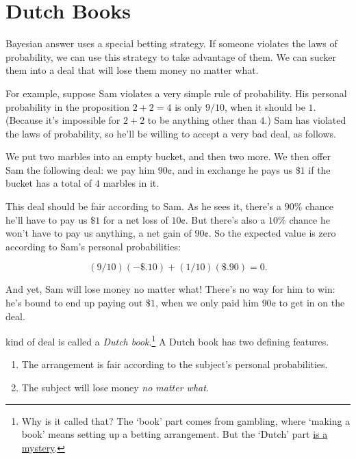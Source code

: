 \documentclass[justified]{tufte-book}
\providecommand{\tightlist}{%
  \setlength{\itemsep}{0pt}\setlength{\parskip}{0pt}}
\theoremstyle{definition}
\theoremstyle{definition}
\theoremstyle{definition}
\theoremstyle{remark}
\begin{document}
\hypertarget{dutch-books-1}{%
\section{Dutch Books}\label{dutch-books-1}}

 Bayesian answer uses a special betting strategy. If someone violates the laws of probability, we can use this strategy to take advantage of them. We can sucker them into a deal that will lose them money no matter what.

For example, suppose Sam violates a very simple rule of probability. His personal probability in the proposition \(2+2=4\) is only \(9/10\), when it should be \(1\). (Because it's impossible for \(2+2\) to be anything other than \(4\).) Sam has violated the laws of probability, so he'll be willing to accept a very bad deal, as follows.

We put two marbles into an empty bucket, and then two more. We then offer Sam the following deal: we pay him \(90\)¢, and in exchange he pays us \(\$1\) if the bucket has a total of \(4\) marbles in it.

This deal should be fair according to Sam. As he sees it, there's a \(90\%\) chance he'll have to pay us \(\$1\) for a net loss of \(10\)¢. But there's also a \(10\%\) chance he won't have to pay us anything, a net gain of \(90\)¢. So the expected value is zero according to Sam's personal probabilities:

\[ (9/10)(-\$.10) + (1/10)(\$.90) = 0. \]

And yet, Sam will lose money no matter what! There's no way for him to win: he's bound to end up paying out \(\$1\), when we only paid him \(90\)¢ to get in on the deal.

 kind of deal is called a \emph{Dutch book}.\footnote{Why is it called that? The `book' part comes from gambling, where `making a book' means setting up a betting arrangement. But the `Dutch' part \href{https://personal.eur.nl/wakker/miscella/dutchbk.htm}{is a mystery}.} A Dutch book has two defining features.

\begin{enumerate}
\def\labelenumi{\arabic{enumi}.}
\tightlist
\item
  The arrangement is fair according to the subject's personal probabilities.
\item
  The subject will lose money \emph{no matter what}.
\end{enumerate}
\end{document}
